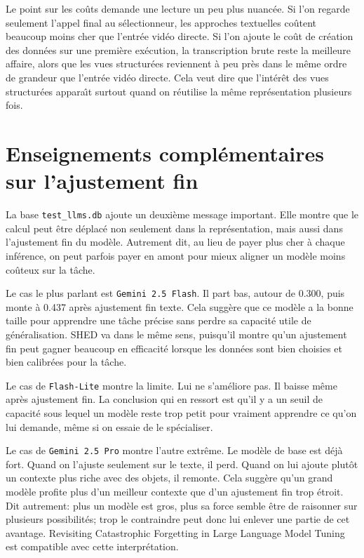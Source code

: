 Le point sur les co\^uts demande une lecture un peu plus nuanc\'ee. Si l'on regarde seulement l'appel final au s\'electionneur, les approches textuelles co\^utent beaucoup moins cher que l'entr\'ee vid\'eo directe. Si l'on ajoute le co\^ut de cr\'eation des donn\'ees sur une premi\`ere ex\'ecution, la transcription brute reste la meilleure affaire, alors que les vues structur\'ees reviennent \`a peu pr\`es dans le m\^eme ordre de grandeur que l'entr\'ee vid\'eo directe. Cela veut dire que l'int\'er\^et des vues structur\'ees appara\^\i t surtout quand on r\'eutilise la m\^eme repr\'esentation plusieurs fois.

\section{Enseignements compl\'ementaires sur l'ajustement fin}

La base \texttt{test\_llms.db} ajoute un deuxi\`eme message important. Elle montre que le calcul peut \^etre d\'eplac\'e non seulement dans la repr\'esentation, mais aussi dans l'ajustement fin du mod\`ele. Autrement dit, au lieu de payer plus cher \`a chaque inf\'erence, on peut parfois payer en amont pour mieux aligner un mod\`ele moins co\^uteux sur la t\^ache.

Le cas le plus parlant est \texttt{Gemini 2.5 Flash}. Il part bas, autour de 0.300, puis monte \`a 0.437 apr\`es ajustement fin texte. Cela sugg\`ere que ce mod\`ele a la bonne taille pour apprendre une t\^ache pr\'ecise sans perdre sa capacit\'e utile de g\'en\'eralisation. SHED \cite{he2024_shed} va dans le m\^eme sens, puisqu'il montre qu'un ajustement fin peut gagner beaucoup en efficacit\'e lorsque les donn\'ees sont bien choisies et bien calibr\'ees pour la t\^ache.

Le cas de \texttt{Flash-Lite} montre la limite. Lui ne s'am\'eliore pas. Il baisse m\^eme apr\`es ajustement fin. La conclusion qui en ressort est qu'il y a un seuil de capacit\'e sous lequel un mod\`ele reste trop petit pour vraiment apprendre ce qu'on lui demande, m\^eme si on essaie de le sp\'ecialiser.

Le cas de \texttt{Gemini 2.5 Pro} montre l'autre extr\^eme. Le mod\`ele de base est d\'ej\`a fort. Quand on l'ajuste seulement sur le texte, il perd. Quand on lui ajoute plut\^ot un contexte plus riche avec des objets, il remonte. Cela sugg\`ere qu'un grand mod\`ele profite plus d'un meilleur contexte que d'un ajustement fin trop \'etroit. Dit autrement: plus un mod\`ele est gros, plus sa force semble \^etre de raisonner sur plusieurs possibilit\'es; trop le contraindre peut donc lui enlever une partie de cet avantage. Revisiting Catastrophic Forgetting in Large Language Model Tuning \cite{li2024_forgetting} est compatible avec cette interpr\'etation.

